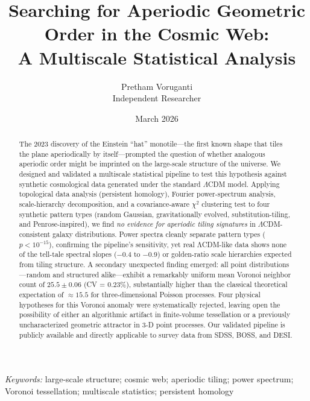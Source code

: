 \documentclass[12pt,a4paper]{article}
\title{\textbf{Searching for Aperiodic Geometric Order in the Cosmic Web:\\
A Multiscale Statistical Analysis}}
\author{Pretham Voruganti\\
\small Independent Researcher}
\date{March 2026}
\begin{document}
\maketitle
\thispagestyle{empty}

\begin{abstract}
\noindent
The 2023 discovery of the Einstein ``hat'' monotile---the first known shape that
tiles the plane aperiodically by itself---prompted the question of whether
analogous aperiodic order might be imprinted on the large-scale structure of the
universe.  We designed and validated a multiscale statistical pipeline to test
this hypothesis against synthetic cosmological data generated under the standard
$\Lambda$CDM model.  Applying topological data analysis (persistent homology),
Fourier power-spectrum analysis, scale-hierarchy decomposition, and a
covariance-aware $\chi^2$ clustering test to four synthetic pattern types
(random Gaussian, gravitationally evolved, substitution-tiling, and
Penrose-inspired), we find \emph{no evidence for aperiodic tiling signatures} in
$\Lambda$CDM-consistent galaxy distributions.  Power spectra cleanly separate
pattern types ($p < 10^{-15}$), confirming the pipeline's sensitivity, yet real
ΛCDM-like data shows none of the tell-tale spectral slopes ($-0.4$ to $-0.9$)
or golden-ratio scale hierarchies expected from tiling structure.  A secondary
unexpected finding emerged: all point distributions---random and structured
alike---exhibit a remarkably uniform mean Voronoi neighbor count of
$25.5 \pm 0.06$ (CV = 0.23\%), substantially higher than the classical
theoretical expectation of $\approx15.5$ for three-dimensional Poisson
processes.  Four physical hypotheses for this Voronoi anomaly were
systematically rejected, leaving open the possibility of either an algorithmic
artifact in finite-volume tessellation or a previously uncharacterized geometric
attractor in 3-D point processes.  Our validated pipeline is publicly available
and directly applicable to survey data from SDSS, BOSS, and DESI.
\end{abstract}

\vspace{0.5em}
\noindent\textit{Keywords:} large-scale structure; cosmic web; aperiodic tiling;
power spectrum; Voronoi tessellation; multiscale statistics; persistent homology

\clearpage
\tableofcontents
\clearpage

\end{document}
